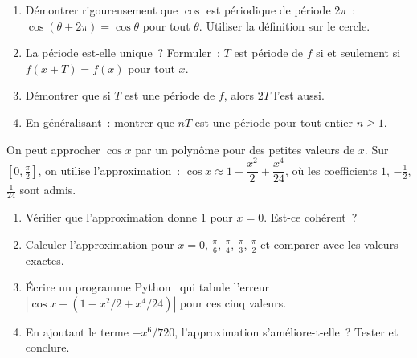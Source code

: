\begin{challenge}
\begin{enumerate}
  \item D\'emontrer rigoureusement que $\cos$ est p\'eriodique de p\'eriode $2\pi$~:
        $\cos(\theta+2\pi)=\cos\theta$ pour tout $\theta$.
        Utiliser la d\'efinition sur le cercle.
  \item La p\'eriode est-elle unique~? Formuler~: \og $T$ est p\'eriode de $f$
        si et seulement si $f(x+T)=f(x)$ pour tout $x$.\fg
  \item D\'emontrer que si $T$ est une p\'eriode de $f$, alors $2T$ l'est aussi.
  \item En g\'en\'eralisant~: montrer que $nT$ est une p\'eriode pour tout entier $n\geq1$.
\end{enumerate}
\end{challenge}

\begin{challenge}
On peut approcher $\cos x$ par un polyn\^ome pour des petites valeurs de $x$.
Sur $[0,\frac{\pi}{2}]$, on utilise l'approximation~:
$\cos x \approx 1 - \dfrac{x^2}{2} + \dfrac{x^4}{24}$,
o\`u les coefficients $1$, $-\frac{1}{2}$, $\frac{1}{24}$ sont admis.
\begin{enumerate}
  \item V\'erifier que l'approximation donne $1$ pour $x=0$. Est-ce coh\'erent~?
  \item Calculer l'approximation pour $x=0$, $\frac{\pi}{6}$, $\frac{\pi}{4}$, $\frac{\pi}{3}$, $\frac{\pi}{2}$
        et comparer avec les valeurs exactes.
  \item \'Ecrire un programme Python \computer\ qui tabule l'erreur
        $|\cos x - (1-x^2/2+x^4/24)|$ pour ces cinq valeurs.
  \item En ajoutant le terme $-x^6/720$, l'approximation s'am\'eliore-t-elle~?
        Tester et conclure.
\end{enumerate}
\end{challenge}



